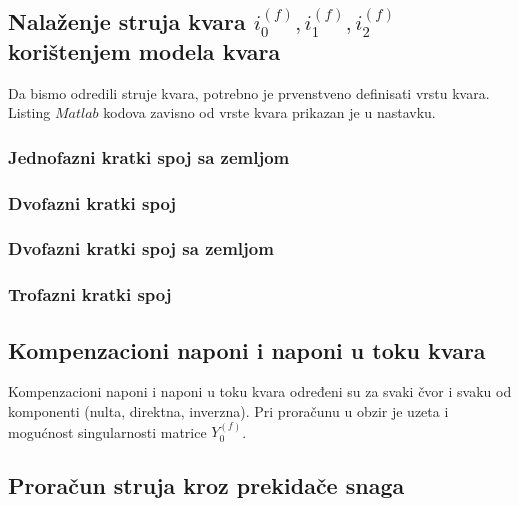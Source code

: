 \documentclass[a4paper, 12pt]{article}
\numberwithin{figure}{section}
\numberwithin{equation}{section}
\begin{document}
\subsection{Nalaženje struja kvara $i^{(f)}_{0}, i^{(f)}_{1}, i^{(f)}_{2}$ korištenjem modela kvara}

Da bismo odredili struje kvara, potrebno je prvenstveno definisati vrstu kvara. Listing $\textit{Matlab}$ kodova zavisno od vrste kvara prikazan je u nastavku.

\subsubsection{Jednofazni kratki spoj sa zemljom}



\subsubsection{Dvofazni kratki spoj}



\subsubsection{Dvofazni kratki spoj sa zemljom}



\subsubsection{Trofazni kratki spoj}



\subsection{Kompenzacioni naponi i naponi u toku kvara}

Kompenzacioni naponi i naponi u toku kvara određeni su za svaki čvor i svaku od komponenti (nulta, direktna, inverzna). Pri proračunu u obzir je uzeta i mogućnost singularnosti matrice $Y^{(f)}_{0}$. \\



\subsection{Proračun struja kroz prekidače snaga}
\end{document}
